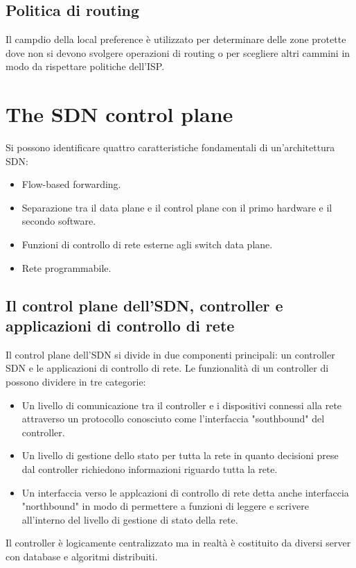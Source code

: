 \subsection{Politica di routing}
Il campdio della local preference \`e utilizzato per determinare delle zone protette dove non si devono svolgere operazioni di routing o per scegliere altri
cammini in modo da rispettare politiche dell'ISP. 
\section{The SDN control plane}
Si possono identificare quattro caratteristiche fondamentali di un'architettura SDN:
\begin{itemize}
\item Flow-based forwarding.
\item Separazione tra il data plane e il control plane con il primo hardware e il secondo software.
\item Funzioni di controllo di rete esterne agli switch data plane.
\item Rete programmabile. 
\end{itemize}
\subsection{Il control plane dell'SDN, controller e applicazioni di controllo di rete}
Il control plane dell'SDN si divide in due componenti principali: un controller SDN e le applicazioni di controllo di rete. Le funzionalit\`a di un 
controller di possono dividere in tre categorie:
\begin{itemize}
\item Un livello di comunicazione tra il controller e i dispositivi connessi alla rete attraverso un protocollo conosciuto come l'interfaccia "southbound"
del controller.
\item Un livello di gestione dello stato per tutta la rete in quanto decisioni prese dal controller richiedono informazioni riguardo tutta la rete. 
\item Un interfaccia verso le applcazioni di controllo di rete detta anche interfaccia "northbound" in modo di permettere a funzioni di leggere e scrivere
all'interno del livello di gestione di stato della rete. 
\end{itemize}
Il controller \`e logicamente centralizzato ma in realt\`a \`e costituito da diversi server con database e algoritmi distribuiti. 
